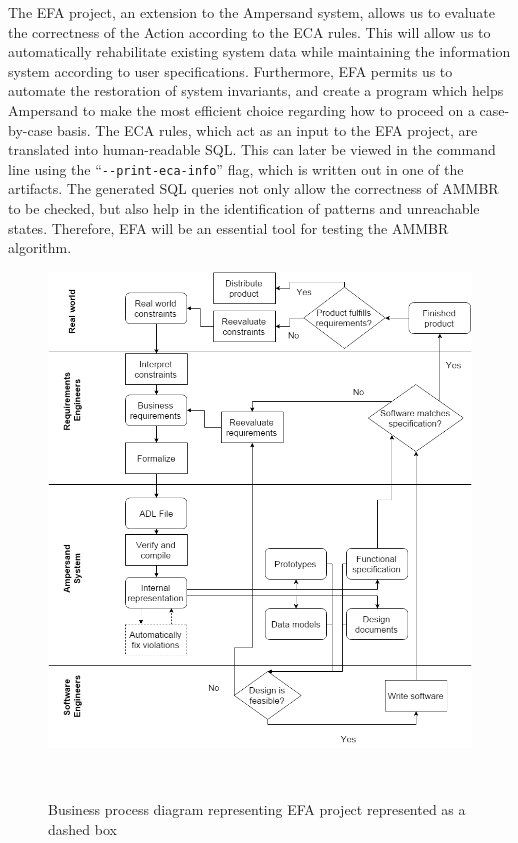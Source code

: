 The EFA project, an extension to the Ampersand system, allows us to evaluate 
the correctness of the Action  according to the ECA rules.
This will 
allow us to automatically rehabilitate  existing system data while 
maintaining the information system according to user specifications. 
Furthermore, EFA permits us to automate the restoration of system invariants, 
and create a program which helps Ampersand to make the most efficient choice 
regarding how to proceed on a case-by-case basis. 
The ECA rules, which act as an 
input to the EFA project, are translated into human-readable SQL.
This can later be viewed in the command line 
using the ``\verb|--print-eca-info|'' flag,
which is written out in one of the artifacts.
The generated SQL queries not only 
allow  the correctness of AMMBR to be checked, but also help in the 
identification of patterns and unreachable states. Therefore, EFA will be an 
essential tool for testing the AMMBR algorithm.


\begin{figure}[!htb]
\begin{center}
\includegraphics[width=\textwidth]{../figures/business_process}
\caption{Business process diagram representing EFA project represented as a dashed box}~\label{fig:EFAproject}
\end{center}
\end{figure}

